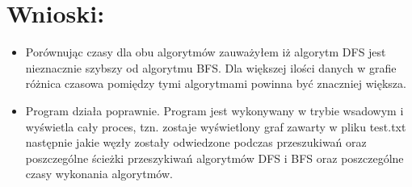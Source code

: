 \documentclass{article}
\begin{document}
\section{Wnioski:}
\begin{itemize}
  \item Porównując czasy dla obu algorytmów zauważyłem iż algorytm DFS jest nieznacznie szybszy od algorytmu BFS. Dla większej ilości danych w grafie różnica czasowa pomiędzy tymi algorytmami powinna być znaczniej większa. 
  \item Program działa poprawnie. Program jest wykonywany w trybie wsadowym i wyświetla cały proces, tzn. zostaje wyświetlony graf zawarty w pliku test.txt następnie jakie węzły zostały odwiedzone podczas przeszukiwań oraz poszczególne ścieżki przeszykiwań algorytmów DFS i BFS oraz poszczególne czasy wykonania algorytmów.
\end{itemize}
\end{document}
